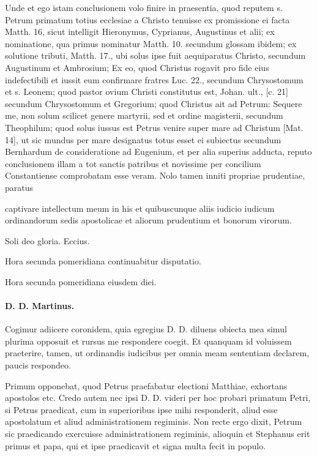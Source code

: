 Unde et ego istam conclusionem volo finire in praesentia, quod reputem s. Petrum primatum totius ecclesiae a Christo tenuisse ex promissione ei facta Matth. 16, sicut intelligit Hieronymus, Cyprianus, Augustinus et alii; ex nominatione, qua primus nominatur Matth. 10. secundum glossam ibidem; ex solutione tributi, Matth. 17., ubi solus ipse fuit aequiparatus Christo, secundum Augustinum et Ambrosium; Ex eo, quod Christus rogavit pro fide eius indefectibili et iussit eum confirmare fratres Luc. 22., secundum Chrysostomum et s. Leonem; quod pastor ovium Christi constitutus est, Johan. ult., [c. 21] secundum Chrysostomum et Gregorium; quod Christus ait ad Petrum: Sequere me, non solum scilicet genere martyrii, sed et ordine magisterii, secundum Theophilum; quod solus iussus est Petrus venire super mare ad Christum [Mat. 14], ut sic mundus per mare designatus totus esset ei subiectus secundum Bernhardum de consideratione ad Eugenium, et per alia superius adducta, reputo conclusionem illam a tot sanctis patribus et novissime per concilium Constantiense comprobatam esse veram. Nolo tamen inniti propriae prudentiae, paratus

captivare intellectum meum in his et quibuscunque aliis iudicio iudicum ordinandorum sedis apostolicae et aliorum prudentium et bonorum virorum.

Soli deo gloria. Eccius.

Hora secunda pomeridiana continuabitur disputatio.

\marginpar{\small[319]} Hora secunda pomeridiana eiusdem diei.

\paragraph*{D. D. Martinus.}

Cogimur adiicere coronidem, quia egregius D. D. diluens obiecta mea simul plurima opposuit et rursus me respondere coegit. Et quanquam id voluissem praeterire, tamen, ut ordinandis iudicibus per omnia meam sententiam declarem, paucis respondeo.

Primum opponebat, quod Petrus praefabatur electioni Matthiae, exhortans apostolos etc. Credo autem nec ipsi D. D. videri per hoc probari primatum Petri, si Petrus praedicat, cum in superioribus ipse mihi responderit, aliud esse apostolatum et aliud administrationem regiminis. Non recte ergo dixit, Petrum sic praedicando exercuisse administrationem regiminis, alioquin et Stephanus erit primus et papa, qui et ipse praedicavit et signa multa fecit in populo.

